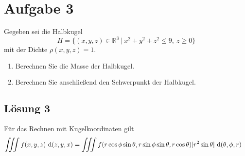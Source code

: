 \documentclass[main.tex]{subfiles}
\begin{document}
\section{Aufgabe 3}
Gegeben sei die Halbkugel
\[
    H = \{ (x,y,z) \in \mathbb{R}^3 \ | \ x^2 + y^2 + z^2 \leq 9, \ z \geq 0 \}
\]
mit der Dichte $\rho(x,y,z) = 1$.
\begin{enumerate}
    \item Berechnen Sie die Masse der Halbkugel.
    \item Berechnen Sie anschließend den Schwerpunkt der Halbkugel.
\end{enumerate}

\subsection{Lösung 3}
Für das Rechnen mit Kugelkoordinaten gilt
\begin{align*}
    \iiint f(x,y,z) ~\mathrm{d}(z,y,x) &= \iiint f(r\cos\phi\sin\theta, r\sin\phi\sin\theta, r\cos\theta ) |r^2\sin\theta| ~\mathrm{d}(\theta, \phi, r)
\end{align*}
\end{document}

